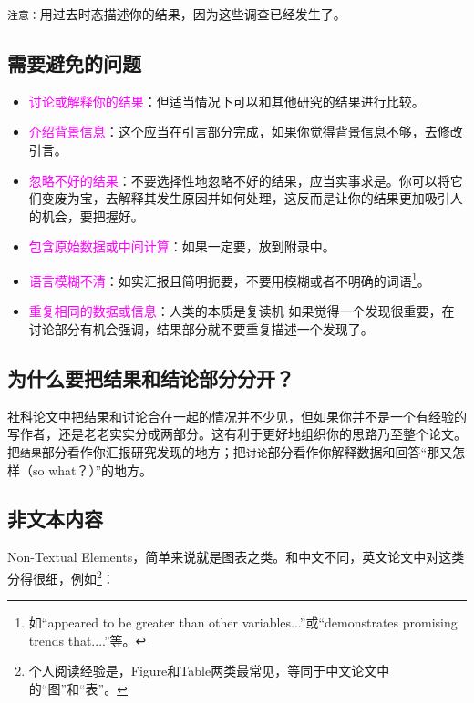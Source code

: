 \documentclass[cn,hazy,blue,14pt,screen]{elegantnote} %
\begin{document}
\lstinline{注意：}用过去时态描述你的结果，因为这些调查已经发生了。

\subsection{需要避免的问题}

\begin{itemize}
  \item \textcolor{magenta}{讨论或解释你的结果}：但适当情况下可以和其他研究的结果进行比较。
  \item \textcolor{magenta}{介绍背景信息}：这个应当在引言部分完成，如果你觉得背景信息不够，去修改引言。
  \item \textcolor{magenta}{忽略不好的结果}：不要选择性地忽略不好的结果，应当实事求是。你可以将它们变废为宝，去解释其发生原因并如何处理，这反而是让你的结果更加吸引人的机会，要把握好。
  \item \textcolor{magenta}{包含原始数据或中间计算}：如果一定要，放到附录中。
  \item \textcolor{magenta}{语言模糊不清}：如实汇报且简明扼要，不要用模糊或者不明确的词语\footnote{如“appeared to be greater than other variables...”或“demonstrates promising trends that....”等。}。
  \item \textcolor{magenta}{重复相同的数据或信息}：\sout{人类的本质是复读机} \quad 如果觉得一个发现很重要，在讨论部分有机会强调，结果部分就不要重复描述一个发现了。
\end{itemize}

\subsection{为什么要把结果和结论部分分开？}

社科论文中把结果和讨论合在一起的情况并不少见，但如果你并不是一个有经验的写作者，还是老老实实分成两部分。这有利于更好地组织你的思路乃至整个论文。把\lstinline{结果}部分看作你汇报研究发现的地方；把\lstinline{讨论}部分看作你解释数据和回答“那又怎样（so what？）”的地方。

\subsection{非文本内容}

Non-Textual Elements，简单来说就是图表之类。和中文不同，英文论文中对这类分得很细，例如\footnote{个人阅读经验是，Figure和Table两类最常见，等同于中文论文中的“图”和“表”。}：
\end{document}
